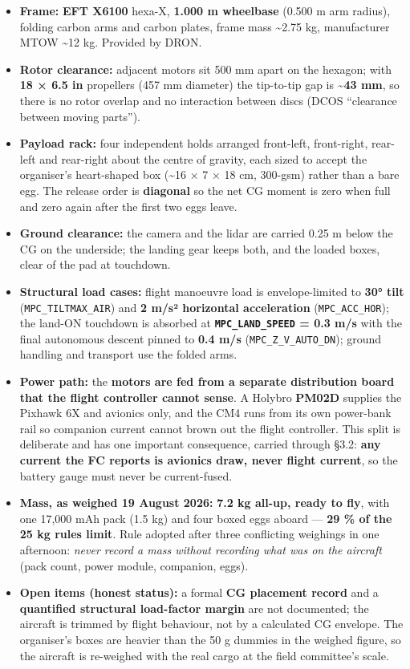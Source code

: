 \documentclass[
  10pt,
  a4paper,
  titlepage]{article}
\providecommand{\tightlist}{%
  \setlength{\itemsep}{0pt}\setlength{\parskip}{0pt}}
\begin{document}
\begin{itemize}
\tightlist
\item
  \textbf{Frame:} \textbf{EFT X6100} hexa-X, \textbf{1.000 m wheelbase}
  (0.500 m arm radius), folding carbon arms and carbon plates, frame
  mass \textasciitilde2.75 kg, manufacturer MTOW \textasciitilde12 kg.
  Provided by DRON.
\item
  \textbf{Rotor clearance:} adjacent motors sit 500 mm apart on the
  hexagon; with \textbf{18 × 6.5 in} propellers (457 mm diameter) the
  tip-to-tip gap is \textbf{\textasciitilde43 mm}, so there is no rotor
  overlap and no interaction between discs (DCOS ``clearance between
  moving parts'').
\item
  \textbf{Payload rack:} four independent holds arranged front-left,
  front-right, rear-left and rear-right about the centre of gravity,
  each sized to accept the organiser's heart-shaped box
  (\textasciitilde16 × 7 × 18 cm, 300-gsm) rather than a bare egg. The
  release order is \textbf{diagonal} so the net CG moment is zero when
  full and zero again after the first two eggs leave.
\item
  \textbf{Ground clearance:} the camera and the lidar are carried 0.25 m
  below the CG on the underside; the landing gear keeps both, and the
  loaded boxes, clear of the pad at touchdown.
\item
  \textbf{Structural load cases:} flight manoeuvre load is
  envelope-limited to \textbf{30° tilt} (\texttt{MPC\_TILTMAX\_AIR}) and
  \textbf{2 m/s² horizontal acceleration} (\texttt{MPC\_ACC\_HOR}); the
  land-ON touchdown is absorbed at \textbf{\texttt{MPC\_LAND\_SPEED} =
  0.3 m/s} with the final autonomous descent pinned to \textbf{0.4 m/s}
  (\texttt{MPC\_Z\_V\_AUTO\_DN}); ground handling and transport use the
  folded arms.
\item
  \textbf{Power path:} the \textbf{motors are fed from a separate
  distribution board that the flight controller cannot sense}. A Holybro
  \textbf{PM02D} supplies the Pixhawk 6X and avionics only, and the CM4
  runs from its own power-bank rail so companion current cannot brown
  out the flight controller. This split is deliberate and has one
  important consequence, carried through §3.2: \textbf{any current the
  FC reports is avionics draw, never flight current}, so the battery
  gauge must never be current-fused.
\item
  \textbf{Mass, as weighed 19 August 2026:} \textbf{7.2 kg all-up, ready
  to fly}, with one 17,000 mAh pack (1.5 kg) and four boxed eggs aboard
  --- \textbf{29 \% of the 25 kg rules limit}. Rule adopted after three
  conflicting weighings in one afternoon: \emph{never record a mass
  without recording what was on the aircraft} (pack count, power module,
  companion, eggs).
\item
  \textbf{Open items (honest status):} a formal \textbf{CG placement
  record} and a \textbf{quantified structural load-factor margin} are
  not documented; the aircraft is trimmed by flight behaviour, not by a
  calculated CG envelope. The organiser's boxes are heavier than the 50
  g dummies in the weighed figure, so the aircraft is re-weighed with
  the real cargo at the field committee's scale.
\end{itemize}
\end{document}
